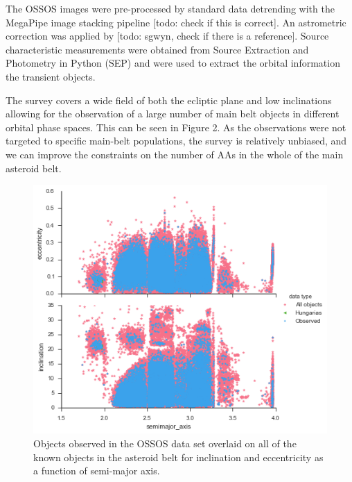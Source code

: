 \documentclass[iop,apj]{emulateapj}
\begin{document}
The OSSOS images were pre-processed by standard data detrending with the MegaPipe image stacking pipeline [todo: check if this is correct]. An astrometric correction was applied by [todo: sgwyn, check if there is a reference]. Source characteristic measurements were obtained from Source Extraction and Photometry in Python (SEP) and were used to extract the orbital information the transient objects. 

The survey covers a wide field of both the ecliptic plane and low inclinations allowing for the observation of a large number of main belt objects in different orbital phase spaces. This can be seen in Figure 2. As the observations were not targeted to specific main-belt populations, the survey is relatively unbiased, and we can improve the constraints on the number of AAs  in the whole of the main asteroid belt. 

\begin{figure}[!htb]
    \centering
    \includegraphics[width=\linewidth]{graphs/obs_e_i.png}
    \caption{Objects observed in the OSSOS data set overlaid on all of the known objects in the asteroid belt for inclination and eccentricity as a function of semi-major axis.}\label{fig:2}
\end{figure}
\end{document}
